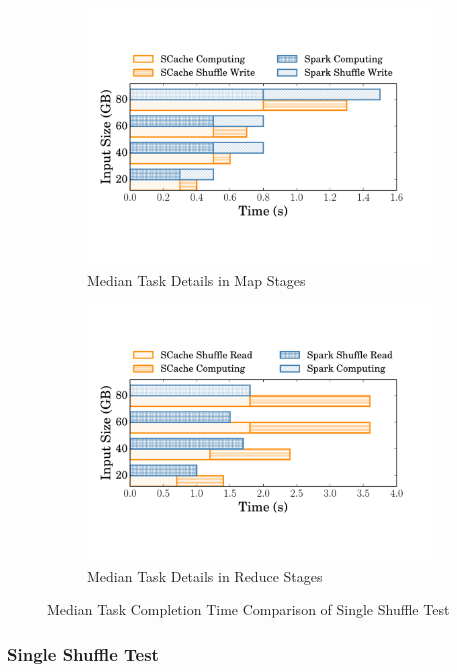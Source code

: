 \begin{figure}
	\begin{subfigure}{\linewidth}
		\centering
		\includegraphics[width=0.9\linewidth]{fig/groupbymaptask}
		\caption{Median Task Details in Map Stages}
		\label{fig:maptask}
	\end{subfigure}
	\begin{subfigure}{\linewidth}
		\centering
		\includegraphics[width=0.9\linewidth]{fig/groupbyreducetask}
		\caption{Median Task Details in Reduce Stages}
		\label{fig:reducetask}
	\end{subfigure}
	\caption{Median Task Completion Time Comparison of Single Shuffle Test}
	\label{fig:singleshuffletask}
\end{figure}
\subsubsection{Single Shuffle Test}
